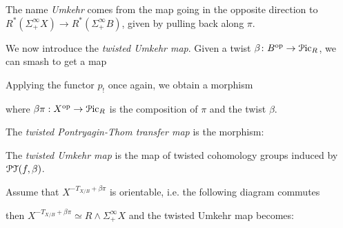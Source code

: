 \documentclass[10pt]{amsart}
\begin{document}
\begin{remark}
	The name \emph{Umkehr} comes from the map going in the opposite direction to $R^*(\Sigma^\infty_+X)\to R^*(\Sigma^\infty_+B)$, given by pulling back along $\pi$. 
\end{remark}
We now introduce the \emph{twisted Umkehr map}. Given a twist $\beta\colon B^{\mathrm{op}} \to \mathcal{P}\mathrm{ic}_R$, we can smash to get a map 
\begin{center}
\end{center}
Applying the functor $p_!$ once again, we obtain a morphism \begin{center}
\end{center}
where $\beta\pi:X^{\mathrm{op}}\to\mathcal{P}\mathrm{ic}_R$ is the composition of $\pi$ and the twist $\beta$.
\begin{definition}
	The \emph{twisted Pontryagin-Thom transfer map} is the morphism:
	\begin{center}
	\end{center}The \emph{twisted Umkehr map} is the map of twisted cohomology groups induced by $\mathcal{P}\mathcal{T}(f,\beta)$. 
\end{definition}
\begin{example}
	Assume that $X^{-T_{X/B}+\beta\pi}$ is orientable, i.e. the following diagram commutes \begin{center} 
	\end{center}then $X^{-T_{X/B}+\beta\pi}\simeq R\wedge\Sigma^\infty_+X$ and the twisted Umkehr map becomes:
	\begin{center}
	\end{center}
\end{example}

{\footnotesize
 
 
 }
\end{document}
